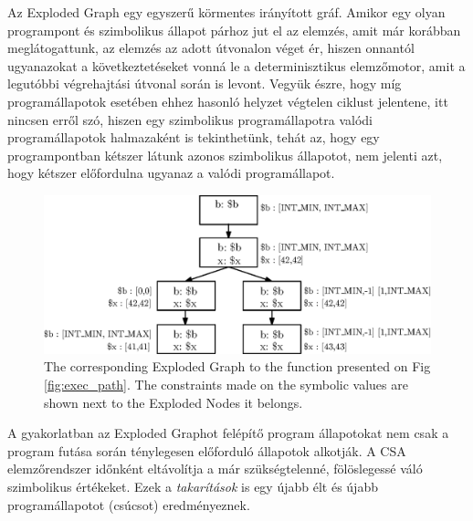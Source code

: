 \documentclass[oneside, a4paper, 12pt]{article}
\theoremstyle{definition}
\begin{document}
Az Exploded Graph egy egyszerű körmentes irányított gráf. Amikor egy olyan 
programpont és szimbolikus
állapot párhoz jut el az elemzés, amit már korábban meglátogattunk, az elemzés
az adott útvonalon véget ér, hiszen onnantól ugyanazokat a
következtetéseket vonná le a determinisztikus elemzőmotor, amit a legutóbbi 
végrehajtási útvonal során is levont.
Vegyük észre, hogy míg programállapotok
esetében ehhez hasonló helyzet végtelen ciklust jelentene, itt nincsen erről 
szó,
hiszen egy szimbolikus programállapotra valódi programállapotok halmazaként is 
tekinthetünk, tehát az,
hogy egy programpontban kétszer látunk azonos szimbolikus állapotot, nem 
jelenti azt, hogy kétszer előfordulna ugyanaz a valódi programállapot.

\begin{figure}[h]
	\centering
	\includegraphics[width=1\textwidth]{img/explodedgraph.eps}
	\caption{The corresponding Exploded Graph to the function presented on Fig 
	\ref{fig:exec_path}. The constraints made on the symbolic values are shown 
	next to the Exploded Nodes it belongs.}
	\label{fig:exploded_graph}
\end{figure}

A gyakorlatban az Exploded Graphot felépítő program állapotokat nem csak a
program futása során ténylegesen előforduló állapotok alkotják. A CSA
elemzőrendszer időnként eltávolítja a már szükségtelenné, fölöslegessé váló
szimbolikus értékeket. Ezek a \textit{takarítások} is egy újabb élt és újabb
programállapotot (csúcsot) eredményeznek.
\end{document}
